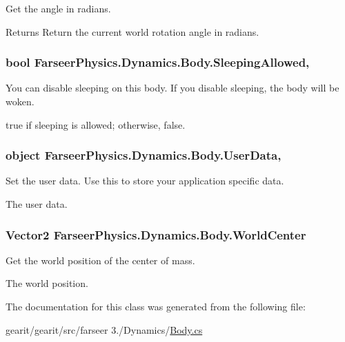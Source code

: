 Get the angle in radians. 

\begin{DoxyReturn}{Returns}
Return the current world rotation angle in radians.
\end{DoxyReturn}
\hypertarget{class_farseer_physics_1_1_dynamics_1_1_body_a6c751c76463ec02d5af4223be31dde79}{
\subsubsection[{Sleeping\+Allowed}]{\setlength{\rightskip}{0pt plus 5cm}bool Farseer\+Physics.\+Dynamics.\+Body.\+Sleeping\+Allowed\hspace{0.3cm}{\ttfamily [get]}, {\ttfamily [set]}}}\label{class_farseer_physics_1_1_dynamics_1_1_body_a6c751c76463ec02d5af4223be31dde79}


You can disable sleeping on this body. If you disable sleeping, the body will be woken. 

{\ttfamily true} if sleeping is allowed; otherwise, {\ttfamily false}.\hypertarget{class_farseer_physics_1_1_dynamics_1_1_body_a5180456df73f44075cd865b3dfedc9c8}{
\subsubsection[{User\+Data}]{\setlength{\rightskip}{0pt plus 5cm}object Farseer\+Physics.\+Dynamics.\+Body.\+User\+Data\hspace{0.3cm}{\ttfamily [get]}, {\ttfamily [set]}}}\label{class_farseer_physics_1_1_dynamics_1_1_body_a5180456df73f44075cd865b3dfedc9c8}


Set the user data. Use this to store your application specific data. 

The user data.\hypertarget{class_farseer_physics_1_1_dynamics_1_1_body_a2f7cd7e7b79a7710cf9f7141ba2e8466}{
\subsubsection[{World\+Center}]{\setlength{\rightskip}{0pt plus 5cm}Vector2 Farseer\+Physics.\+Dynamics.\+Body.\+World\+Center\hspace{0.3cm}{\ttfamily [get]}}}\label{class_farseer_physics_1_1_dynamics_1_1_body_a2f7cd7e7b79a7710cf9f7141ba2e8466}


Get the world position of the center of mass. 

The world position.

The documentation for this class was generated from the following file\+:\begin{DoxyCompactItemize}
\item 
gearit/gearit/src/farseer 3./\+Dynamics/\hyperlink{_body_8cs}{Body.\+cs}\end{DoxyCompactItemize}
